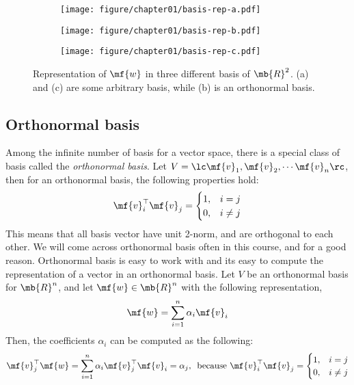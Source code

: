 \begin{figure}[h]
    \centering
    \begin{subfigure}[b]{0.28\textwidth}
        \texttt{[image: figure/chapter01/basis-rep-a.pdf]}
        \caption{}
        \label{fig:ch01-basis1}
    \end{subfigure}
    \begin{subfigure}[b]{0.28\textwidth}
        \centering
        \texttt{[image: figure/chapter01/basis-rep-b.pdf]}
        \caption{}
        \label{fig:ch01-basis2}
    \end{subfigure}
    \begin{subfigure}[b]{0.40\textwidth}
        \centering
        \texttt{[image: figure/chapter01/basis-rep-c.pdf]}
        \caption{}
        \label{fig:ch01-basis3}
    \end{subfigure}
    \caption{Representation of $\mf{w}$ in three different basis of $\mb{R}^2$. (a) and (c) are some arbitrary basis, while (b) is an orthonormal basis.}
\end{figure}

\subsection{Orthonormal basis}
Among the infinite number of basis for a vector space, there is a special class of basis called the \textit{orthonormal basis}. Let $V = \lc \mf{v}_1, \mf{v}_2, \cdots \mf{v}_n\rc$, then for an orthonormal basis, the following properties hold:
\begin{equation}
    \mf{v}_i^\top\mf{v}_j = \begin{cases} 1, & i = j \\ 0, & i \neq j \end{cases}
\end{equation}
This means that all basis vector have unit 2-norm, and are orthogonal to each other. We will come across orthonormal basis often in this course, and for a good reason. Orthonormal basis is easy to work with and its easy to compute the representation of a vector in an orthonormal basis. Let $V$ be an orthonormal basis for $\mb{R}^n$, and let $\mf{w} \in \mb{R}^n$ with the following representation,
\[ \mf{w} = \sum_{i=1}^n \alpha_i \mf{v}_i \]
Then, the coefficients $\alpha_i$ can be computed as the following:
\[ \mf{v}_j^\top\mf{w} =  \sum_{i=1}^n \alpha_i \mf{v}_j^\top\mf{v}_i = \alpha_j, \,\,\, \text{because } \mf{v}_i^\top\mf{v}_j = \begin{cases} 1, & i = j \\ 0, & i \neq j \end{cases} \]

